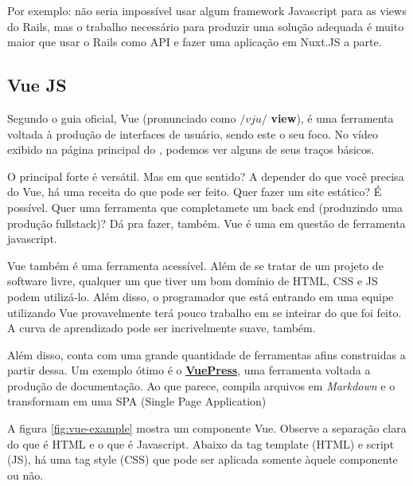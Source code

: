 Por exemplo: não seria impossível usar algum framework Javascript para as views do Rails, mas
o trabalho necessário para produzir uma solução adequada é muito maior que usar o Rails como
API e fazer uma aplicação em Nuxt.JS a parte.

\subsection{Vue JS}\label{subsec:vue-js}

Segundo o guia oficial, Vue (pronunciado como $/vju/$ \dir \textbf{view}), é uma ferramenta
voltada à produção de interfaces de usuário, sendo este o seu foco. No vídeo exibido na página
principal do , podemos ver alguns de seus traços básicos.

O principal forte é versátil. Mas em que sentido? A depender do que você precisa do Vue, há uma
receita do que pode ser feito. Quer fazer um site estático? É possível. Quer uma ferramenta que
completamete um back end (produzindo uma produção fullstack)? Dá pra fazer, também. Vue é uma
 em questão de ferramenta javascript.

Vue também é uma ferramenta acessível. Além de se tratar de um projeto de software livre, qualquer
um que tiver um bom domínio de HTML, CSS e JS podem utilizá-lo. Além disso, o programador que está
entrando em uma equipe utilizando Vue provavelmente terá pouco trabalho em se inteirar do que foi
feito. A curva de aprendizado pode ser incrivelmente suave, também.

Além disso, conta com uma grande quantidade de ferramentas afins construidas a partir dessa. Um
exemplo ótimo é o \href{https://www.youtube.com/watch?v=lIv1ItUzktc}{\textbf{VuePress}}, uma
ferramenta voltada a produção de documentação. Ao que parece, compila arquivos em \emph{Markdown}
e o transformam em uma SPA (Single Page Application)

A figura \ref{fig:vue-example} mostra um componente Vue. Observe a separação clara do que é HTML e
o que é Javascript. Abaixo da tag template (HTML) e script (JS), há uma tag style (CSS) que pode ser
aplicada somente àquele componente ou não.


